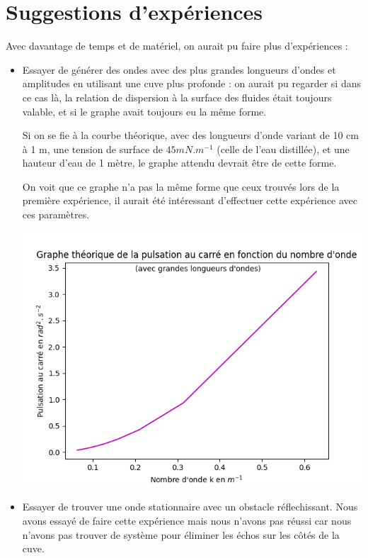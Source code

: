 \documentclass{report}
\begin{document}
\section{Suggestions d'expériences}
Avec davantage de temps et de matériel, on aurait pu faire plus d'expériences :
\begin{itemize}[label=]
    \item Essayer de générer des ondes avec des plus grandes longueurs d'ondes et amplitudes en utilisant une cuve plus profonde : on aurait pu regarder si dans ce cas là, la relation de dispersion à la surface des fluides était toujours valable, et si le graphe avait toujours eu la même forme.

    \begin{minipage}{0.6\textwidth}
    Si on se fie à la courbe théorique, avec des longueurs d'onde variant de 10 cm à 1 m, une tension de surface de $45 mN.m^{-1}$ (celle de l'eau distillée), et une hauteur d'eau de 1 mètre, le graphe attendu devrait être de cette forme.
    \newline
    
    On voit que ce graphe n'a pas la même forme que ceux trouvés lors de la première expérience, il aurait été intéressant d'effectuer cette expérience avec ces paramètres.
    \end{minipage}
    \hfill
    \begin{minipage}{0.4\textwidth}
      \includegraphics[scale=0.36]{graphe3.png}
    \end{minipage}

     
    \item Essayer de trouver une onde stationnaire avec un obstacle réflechissant. Nous avons essayé de faire cette expérience mais nous n'avons pas réussi car nous n'avons pas trouver de système pour éliminer les échos sur les côtés de la cuve. 


\end{itemize}
\end{document}
